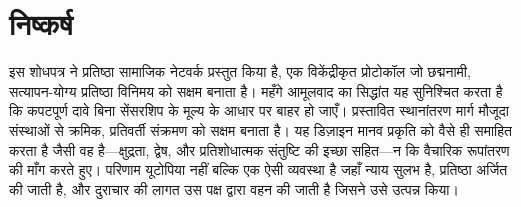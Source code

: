 \documentclass[11pt,a4paper,twocolumn]{article}
\begin{document}
\section{निष्कर्ष}

इस शोधपत्र ने प्रतिष्ठा सामाजिक नेटवर्क प्रस्तुत किया है, एक विकेंद्रीकृत प्रोटोकॉल जो छद्मनामी, सत्यापन-योग्य प्रतिष्ठा विनिमय को सक्षम बनाता है। महँगे आमूलवाद का सिद्धांत यह सुनिश्चित करता है कि कपटपूर्ण दावे बिना सेंसरशिप के मूल्य के आधार पर बाहर हो जाएँ। प्रस्तावित स्थानांतरण मार्ग मौजूदा संस्थाओं से क्रमिक, प्रतिवर्ती संक्रमण को सक्षम बनाता है। यह डिज़ाइन मानव प्रकृति को वैसे ही समाहित करता है जैसी वह है---क्षुद्रता, द्वेष, और प्रतिशोधात्मक संतुष्टि की इच्छा सहित---न कि वैचारिक रूपांतरण की माँग करते हुए। परिणाम यूटोपिया नहीं बल्कि एक ऐसी व्यवस्था है जहाँ न्याय सुलभ है, प्रतिष्ठा अर्जित की जाती है, और दुराचार की लागत उस पक्ष द्वारा वहन की जाती है जिसने उसे उत्पन्न किया।


\end{document}
